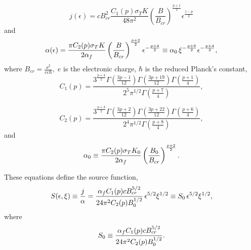 \begin{equation}
j(\epsilon) = cB_{cr}^{2} \frac{C_1(p) \sigma_T K}{48\pi^2}\left(\frac{B}{B_{cr}}\right)^{\frac{p+1}{2}} \epsilon^{\frac{1-p}{2}}\label{eq:emission_coefficient}
\end{equation}
and
\begin{equation}
\alpha(\epsilon) = \frac{\pi C_2(p) \sigma_T K}{2 \alpha_f}\left(\frac{B}{B_{cr}}\right)^{\frac{p+2}{2}} \epsilon^{-\frac{p+4}{2}} \equiv \alpha_0 \, \xi^{-\frac{p+6}{2}} \epsilon^{-\frac{p+4}{2}}, \label{eq:absorption_coefficient}
\end{equation}
where $ B_{cr} = \frac{\ee^2}{c e \hbar} , \; e $ is the electronic charge, $ \hbar $ is the reduced Planck's constant,
\begin{equation}
C_1(p) = \dfrac{ 3^{\frac{p+4}{2}} \Gamma(\frac{3p-1}{12}) \Gamma(\frac{3p+19}{12}) \Gamma(\frac{p+1}{4}) }{ 2^5 \pi^{1/2} \Gamma(\frac{p+7}{4}) }, \label{eq:C_1}
\end{equation}

\begin{equation}
C_2(p) = \dfrac{ 3^{\frac{p+3}{2}} \Gamma(\frac{3p+2}{12}) \Gamma(\frac{3p+22}{12}) \Gamma(\frac{p+6}{4}) }{ 2^4 \pi^{1/2} \Gamma(\frac{p+8}{4}) }, \label{eq:C_2}
\end{equation}
and
\begin{equation}
\alpha_0 \equiv  \frac{\pi C_2(p) \sigma_T K_0}{2 \alpha_f}\left(\frac{B_0}{B_{cr}}\right)^{\frac{p+2}{2}}. \label{eq:alphazero}
\end{equation}

These equations define the source function,
\begin{equation}
S(\epsilon, \xi) \equiv \frac{j}{\alpha} = \dfrac{\alpha_f C_1(p) c B_{cr}^{5/2}}{24 \pi^2 C_2(p) B_0^{1/2}} \, \epsilon^{5/2} \xi^{1/2} \equiv S_0 \, \epsilon^{5/2} \xi^{1/2} , \label{eq:source_function}
\end{equation} where
\begin{equation}
S_0 \equiv \dfrac{\alpha_f C_1(p) c B_{cr}^{5/2}}{24 \pi^2 C_2(p) B_0^{1/2}}. \label{eq:Szero}
\end{equation}



